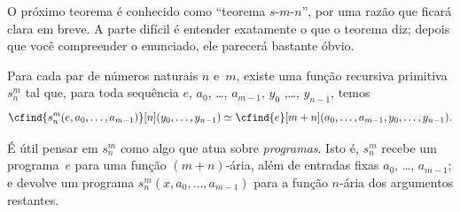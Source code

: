 \documentclass[../../../include/open-logic-section]{subfiles}
\begin{document}

\begin{explain}
O próximo teorema é conhecido como ``teorema $s$-$m$-$n$'', por uma
razão que ficará clara em breve. A parte difícil é entender exatamente
o que o teorema diz; depois que você compreender o enunciado, ele
parecerá bastante óbvio.
\end{explain}

\begin{thm}
  Para cada par de números naturais $n$ e~$m$, existe uma função
  recursiva primitiva~$s^m_n$ tal que, para toda sequência
  $e$, $a_0$, \dots, $a_{m-1}$, $y_0$ ,\dots, $y_{n-1}$, temos
  \[
  \cfind{s^m_n(e, a_0, \dots, a_{m-1})}[n](y_0, \dots, y_{n-1}) \simeq
  \cfind{e}[m+n](a_0, \dots, a_{m-1}, y_0, \dots, y_{n-1}).
\]
\end{thm}

\begin{explain}
É útil pensar em $s^m_n$ como algo que atua sobre \emph{programas}.
Isto é, $s^m_n$ recebe um programa~$e$ para uma função $(m+n)$-ária,
além de entradas fixas $a_0$, \dots, $a_{m-1}$; e devolve um programa
$s^m_n(x, a_0, \dots, a_{m-1})$ para a função $n$-ária dos argumentos
restantes. 
\end{explain}
\end{document}
